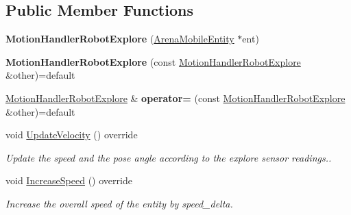 \subsection*{Public Member Functions}
\begin{DoxyCompactItemize}
\item 
\mbox{\label{class_motion_handler_robot_explore_a5d62df9b7ffd800d4b35859ba1a72f3e}} 
{\bfseries Motion\+Handler\+Robot\+Explore} (\mbox{\hyperlink{class_arena_mobile_entity}{Arena\+Mobile\+Entity}} $\ast$ent)
\item 
\mbox{\label{class_motion_handler_robot_explore_ae82ba22271a4cf497d68f4bcd8c4b4e4}} 
{\bfseries Motion\+Handler\+Robot\+Explore} (const \mbox{\hyperlink{class_motion_handler_robot_explore}{Motion\+Handler\+Robot\+Explore}} \&other)=default
\item 
\mbox{\label{class_motion_handler_robot_explore_a4ee07340d788ea4fdc7de86b5f51da02}} 
\mbox{\hyperlink{class_motion_handler_robot_explore}{Motion\+Handler\+Robot\+Explore}} \& {\bfseries operator=} (const \mbox{\hyperlink{class_motion_handler_robot_explore}{Motion\+Handler\+Robot\+Explore}} \&other)=default
\item 
\mbox{\label{class_motion_handler_robot_explore_a88d0b13f1082475630d1955258aaa174}} 
void \mbox{\hyperlink{class_motion_handler_robot_explore_a88d0b13f1082475630d1955258aaa174}{Update\+Velocity}} () override
\begin{DoxyCompactList}\small\item\em Update the speed and the pose angle according to the explore sensor readings.. \end{DoxyCompactList}\item 
\mbox{\label{class_motion_handler_robot_explore_aa52a668bd64c17b56dbd0be199cddc2c}} 
void \mbox{\hyperlink{class_motion_handler_robot_explore_aa52a668bd64c17b56dbd0be199cddc2c}{Increase\+Speed}} () override
\begin{DoxyCompactList}\small\item\em Increase the overall speed of the entity by speed\+\_\+delta. \end{DoxyCompactList}\item 

\end{DoxyCompactItemize}

